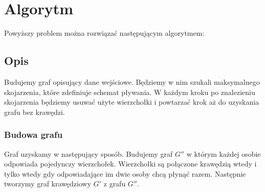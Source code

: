 \documentclass{llncs}
\begin{document}
\section{Algorytm}
Powyższy problem można rozwiązać następującym algorytmem:

\subsection{Opis}
Budujemy graf opisujący dane wejściowe. Będziemy w nim szukali 
maksymalnego skojarzenia, które zdefiniuje schemat pływania.
W każdym kroku po znalezieniu skojarzenia będziemy usuwać 
użyte wierzchołki i powtarzać krok aż do uzyskania grafu bez krawędzi.

\subsubsection{Budowa grafu}
Graf uzyskamy w następujący sposób. Budujemy
graf $G''$ w którym każdej osobie odpowiada pojedynczy 
wierzchołek. Wierzchołki są połączone krawędzią wtedy
i tylko wtedy gdy odpowiadające im dwie osoby chcą płynąć razem.
Następnie tworzymy graf krawędziowy $G'$ z grafu $G''$.
\end{document}
